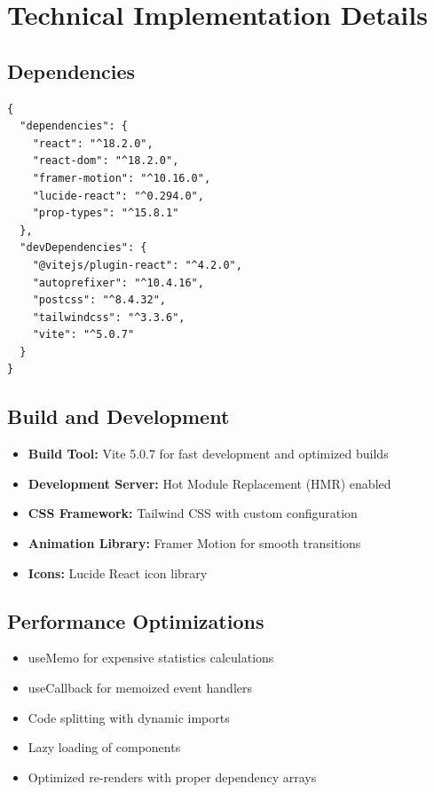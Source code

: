 \documentclass[12pt,a4paper]{article}
\begin{document}
\newpage

\section{Technical Implementation Details}

\subsection{Dependencies}
\begin{verbatim}
{
  "dependencies": {
    "react": "^18.2.0",
    "react-dom": "^18.2.0",
    "framer-motion": "^10.16.0",
    "lucide-react": "^0.294.0",
    "prop-types": "^15.8.1"
  },
  "devDependencies": {
    "@vitejs/plugin-react": "^4.2.0",
    "autoprefixer": "^10.4.16",
    "postcss": "^8.4.32",
    "tailwindcss": "^3.3.6",
    "vite": "^5.0.7"
  }
}
\end{verbatim}

\subsection{Build and Development}
\begin{itemize}
    \item \textbf{Build Tool:} Vite 5.0.7 for fast development and optimized builds
    \item \textbf{Development Server:} Hot Module Replacement (HMR) enabled
    \item \textbf{CSS Framework:} Tailwind CSS with custom configuration
    \item \textbf{Animation Library:} Framer Motion for smooth transitions
    \item \textbf{Icons:} Lucide React icon library
\end{itemize}

\subsection{Performance Optimizations}
\begin{itemize}
    \item useMemo for expensive statistics calculations
    \item useCallback for memoized event handlers
    \item Code splitting with dynamic imports
    \item Lazy loading of components
    \item Optimized re-renders with proper dependency arrays
\end{itemize}
\end{document}
